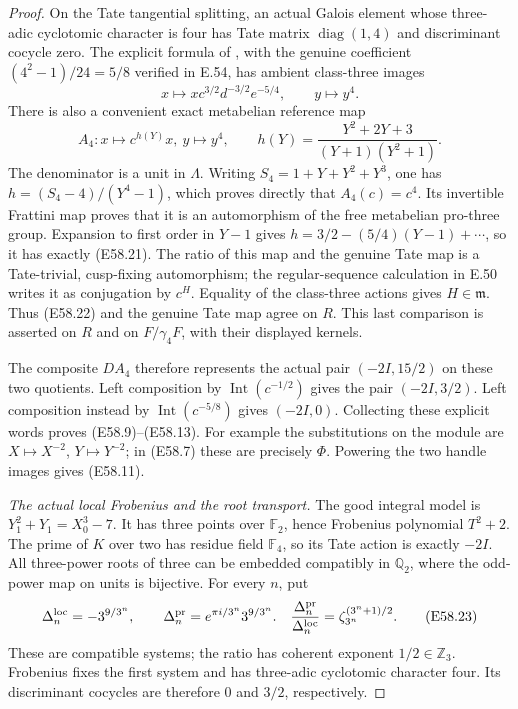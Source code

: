 \begin{proof}
On the Tate tangential splitting, an actual Galois element whose
three-adic cyclotomic character is four has Tate matrix $\operatorname{diag}(1,4)$
and discriminant cocycle zero.
The explicit formula of \cite[Theorem 5.2.4]{A_Nakamura2013},
with the genuine coefficient $(4^2-1)/24=5/8$ verified in E.54,
has ambient class-three images
\[
 x\longmapsto x c^{3/2}d^{-3/2}e^{-5/4},
 \qquad y\longmapsto y^4.
 \tag{E58.21}
\]
There is also a convenient exact metabelian reference map
\[
 A_4:x\longmapsto c^{h(Y)}x,\ y\longmapsto y^4,
 \qquad h(Y)=\frac{Y^2+2Y+3}{(Y+1)(Y^2+1)}.
 \tag{E58.22}
\]
The denominator is a unit in $\Lambda$. Writing
$S_4=1+Y+Y^2+Y^3$, one has
$h=(S_4-4)/(Y^4-1)$, which proves directly that $A_4(c)=c^4$.
Its invertible Frattini map proves that it is an automorphism
of the free metabelian pro-three group.
Expansion to first order in $Y-1$ gives
$h=3/2-(5/4)(Y-1)+\cdots$, so it has exactly (E58.21).
The ratio of this map and the genuine Tate map is a
Tate-trivial, cusp-fixing automorphism; the regular-sequence
calculation in E.50 writes it as conjugation by $c^H$.
Equality of the class-three actions gives $H\in\mathfrak m$.
Thus (E58.22) and the genuine Tate map agree on $R$.
This last comparison is asserted on $R$ and on
$F/\gamma_4F$, with their displayed kernels.

The composite $DA_4$ therefore represents the actual pair
$(-2I,15/2)$ on these two quotients. Left composition by
$\operatorname{Int}(c^{-1/2})$ gives the pair
$(-2I,3/2)$. Left composition instead by
$\operatorname{Int}(c^{-5/8})$ gives $(-2I,0)$.
Collecting these explicit words proves (E58.9)--(E58.13).
For example the substitutions on the module are
$X\mapsto X^{-2}$, $Y\mapsto Y^{-2}$;
in (E58.7) these are precisely $\Phi$.
Powering the two handle images gives (E58.11).

\emph{The actual local Frobenius and the root transport.}
The good integral model is $Y_1^2+Y_1=X_0^3-7$.
It has three points over $\mathbb F_2$, hence Frobenius
polynomial $T^2+2$. The prime of $K$ over two has residue
field $\mathbb F_4$, so its Tate action is exactly $-2I$.
All three-power roots of three can be embedded compatibly
in $\mathbb Q_2$, where the odd-power map on units is bijective.
For every $n$, put
\[
 \Delta_n^{\rm loc}=-3^{9/3^n},\qquad
 \Delta_n^{\rm pr}=e^{\pi i/3^n}3^{9/3^n}.
 \quad
 \frac{\Delta_n^{\rm pr}}{\Delta_n^{\rm loc}}
       =\zeta_{3^n}^{(3^n+1)/2}.
 \tag{E58.23}
\]
These are compatible systems; the ratio has coherent exponent
$1/2\in\mathbb Z_3$. Frobenius fixes the first system and has
three-adic cyclotomic character four. Its discriminant cocycles are
therefore $0$ and $3/2$, respectively.


\end{proof}

